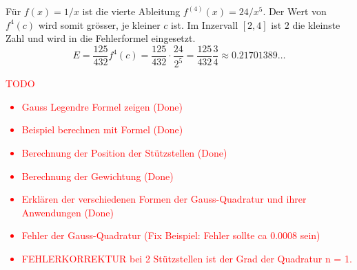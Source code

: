 Für $f(x) = 1/x$ ist die vierte Ableitung $f^{(4)}(x) = 24/x^{5}$. 
Der Wert von $f^{4}(c)$ wird somit grösser, je kleiner $c$ ist.
Im Inzervall $[2,4]$ ist $2$ die kleinste Zahl und wird in die Fehlerformel eingesetzt.
\begin{equation}
    E = \frac{125}{432}f^{4}(c) = \frac{125}{432} \cdot \frac{24}{2^{5}} = \frac{125}{432}\frac{3}{4} \approx 0.21701389\dots
\end{equation}


\textcolor{red}{
    TODO
    \begin{itemize}
        \item Gauss Legendre Formel zeigen (Done)
        \item Beispiel berechnen mit Formel (Done)
        \item Berechnung der Position der Stützstellen (Done)
        \item Berechnung der Gewichtung (Done)
        \item Erklären der verschiedenen Formen der Gauss-Quadratur und ihrer Anwendungen (Done)
        \item Fehler der Gauss-Quadratur (Fix Beispiel: Fehler sollte ca 0.0008 sein)
        \item FEHLERKORREKTUR bei 2 Stützstellen ist der Grad der Quadratur n = 1. 
    \end{itemize}
}

